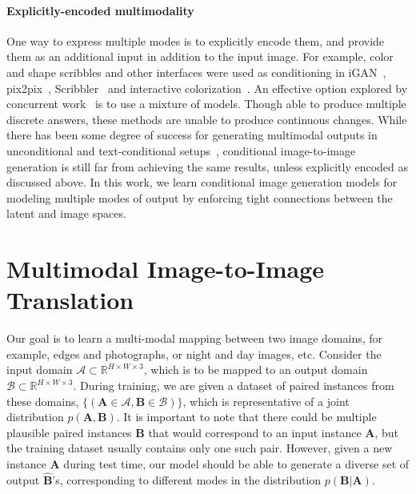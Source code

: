 \paragraph{Explicitly-encoded multimodality} One way to express multiple modes is to explicitly encode them, and provide them as an additional input in addition to the input image. For example, color and shape scribbles and other interfaces were used as conditioning in iGAN~\citep{zhu2016generative}, pix2pix~\citep{isola2016image}, Scribbler~\citep{sangkloy2017scribbler} and interactive colorization~\citep{zhang2017real}. An effective option explored by concurrent work~\citep{ghosh2017multi, chen2017photographic,bansal2017pixelnn} is to use a mixture of models. Though able to produce multiple discrete answers, these methods are unable to produce continuous changes. While there has been some degree of success for generating multimodal outputs in unconditional and text-conditional setups~\citep{goodfellow2014generative,nguyen2016plug,reed2016generative,dinh2016density,larsen2016vaegan}, conditional image-to-image generation is still far from achieving the same results, unless explicitly encoded as discussed above. In this work, we learn conditional image generation models for modeling multiple modes of output by enforcing tight connections between the latent and image spaces.

\section{Multimodal Image-to-Image Translation}
\label{sec:methods}
Our goal is to learn a multi-modal mapping between two image domains, for example, edges and photographs, or night and day images, etc. Consider the input domain $\mathcal{A}\!\subset\!\mathds{R}^{H\!\times W\!\times 3}$, which is to be mapped to an output domain $\mathcal{B}\!\subset\!\mathds{R}^{H\!\times W\!\times 3}$. During training, we are given a dataset of paired instances from these domains, $\big\{(\mathbf{A}\!\in\!\mathcal{A}, \mathbf{B}\!\in\!\mathcal{B})\big\}$, which is representative of a joint distribution $p(\mathbf{A},\mathbf{B})$.
It is important to note that there could be multiple plausible paired instances $\mathbf{B}$ that would correspond to an input instance $\mathbf{A}$, but the training dataset usually contains only one such pair. However, given a new instance $\mathbf{A}$ during test time, our model should be able to generate a diverse set of output $\widehat{\mathbf{B}}$'s, corresponding to different modes in the distribution $p(\mathbf{B}|\mathbf{A})$.

